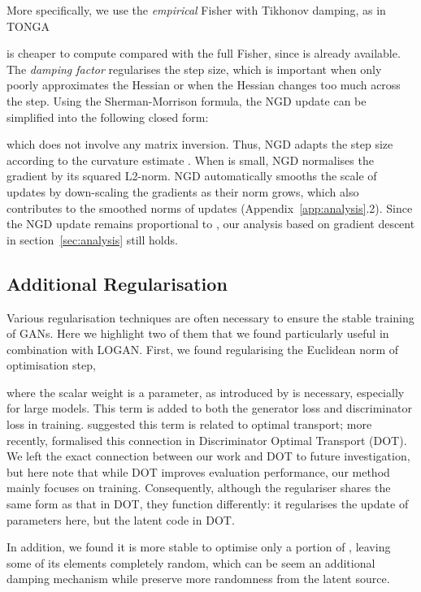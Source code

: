 \documentclass{article} \usepackage{iclr2020_conference,times}
\begin{document}
More specifically, we use the \emph{empirical} Fisher  with Tikhonov damping, as in TONGA~\citep{roux2008topmoumoute}

 is cheaper to compute compared with the full Fisher, since  is already available.
The \emph{damping factor}  regularises the step size, which is important when  only poorly approximates the Hessian or when the Hessian changes too much across the step.
Using the Sherman-Morrison formula, the NGD update can be simplified into the following closed form:

which does not involve any matrix inversion. Thus, NGD adapts the step size according to the curvature estimate .
When  is small, NGD normalises the gradient by its squared L2-norm.
NGD automatically smooths the scale of updates by down-scaling the gradients as their norm grows, which also contributes to the smoothed norms of updates (Appendix~\ref{app:analysis}.2). Since the NGD update remains proportional to , our analysis based on gradient descent in section~\ref{sec:analysis} still holds. 

\subsection*{Additional Regularisation}

Various regularisation techniques are often necessary to ensure the stable training of GANs. Here we highlight two of them that we found particularly useful in combination with LOGAN. First, we found regularising the Euclidean norm of optimisation step,

where the scalar weight  is a parameter, as introduced by \citet{wu2019deep} is necessary, especially for large models. This term is added to both the generator loss and discriminator loss in training. \citet{wu2019deep} suggested this term is related to optimal transport; more recently, \citet{tanaka2019discriminator} formalised this connection in Discriminator Optimal Transport (DOT). We left the exact connection between our work and DOT to future investigation, but here note that while DOT improves evaluation performance, our method mainly focuses on training. Consequently, although the regulariser  shares the same form as that in DOT, they function differently: it regularises the update of parameters here, but the latent code  in DOT.

In addition, we found it is more stable to optimise only a portion  of , leaving some of its elements completely random, which can be seem an additional damping mechanism while preserve more randomness from the latent source.
\end{document}
